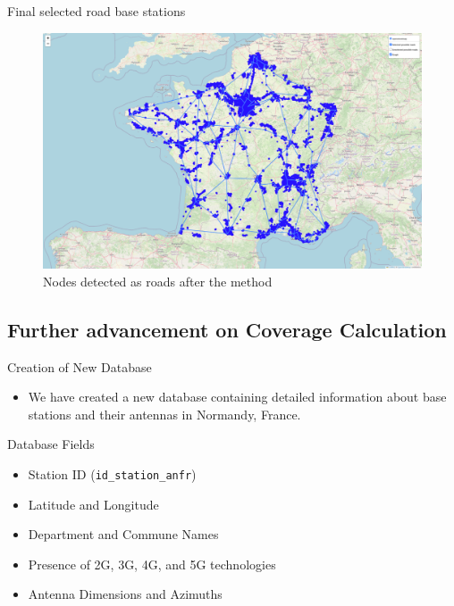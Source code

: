\begin{frame}{Final selected road base stations}
    \begin{figure}
        \includegraphics[height=0.6\paperheight]{images/road_detection/roads detected.png}
        \caption{Nodes detected as roads after the method}
    \end{figure}
\end{frame}


\subsection{Further advancement on Coverage Calculation}
\insertsubsectionframe
    
\begin{frame}{Creation of New Database}
    \begin{itemize}
        \item We have created a new database containing detailed information about base stations and their antennas in Normandy, France.
    \end{itemize}
    \begin{block}{Database Fields}
        \begin{itemize}
            \item Station ID (\texttt{id\_station\_anfr})
            \item Latitude and Longitude
            \item Department and Commune Names
            \item Presence of 2G, 3G, 4G, and 5G technologies
            \item Antenna Dimensions and Azimuths
        \end{itemize}
    \end{block}
\end{frame}
    
